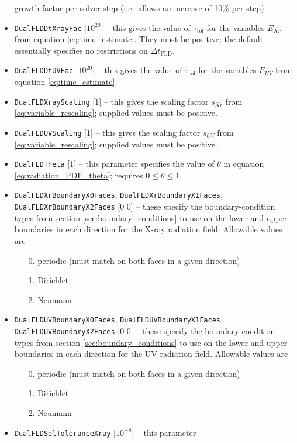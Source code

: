 \documentclass[letterpaper,10pt]{article}
\renewcommand{\(}{\left(}
\renewcommand{\)}{\right)}
\newcommand{\dt}{\Delta t}
\begin{document}
\begin{itemize}
  growth factor per solver step (i.e.~allows an increase of 10\% per step).
\item {\tt DualFLDDtXrayFac} [$10^{20}$] -- this gives the value
  of $\tau_{\text{tol}}$ for the variables $E_{Xr}$ from equation
  \eqref{eq:time_estimate}.  They must be positive; the default
  essentially specifies no restrictions on $\dt_{\text{FLD}}$. 
\item {\tt DualFLDDtUVFac} [$10^{20}$] -- this gives the value
  of $\tau_{\text{tol}}$ for the variables $E_{UV}$ from equation
  \eqref{eq:time_estimate}.
\item {\tt DualFLDXrayScaling} [1] -- this gives the scaling 
  factor $s_{Xr}$ from \eqref{eq:variable_rescaling}; supplied values
  must be positive. 
\item {\tt DualFLDUVScaling} [1] -- this gives the scaling 
  factor $s_{UV}$ from \eqref{eq:variable_rescaling}; supplied values
  must be positive. 
\item {\tt DualFLDTheta} [1] -- this parameter specifies the
  value of $\theta$ in equation \eqref{eq:radiation_PDE_theta};
  requires $0\le\theta\le 1$.
\item {\tt DualFLDXrBoundaryX0Faces}, {\tt DualFLDXrBoundaryX1Faces},
  {\tt DualFLDXrBoundaryX2Faces} [0 0] --  these specify the
  boundary-condition types from section \ref{sec:boundary_conditions}
  to use on the lower and upper boundaries in each direction for the
  X-ray radiation field.  Allowable values are
  \begin{itemize}
  \item[0.] periodic (must match on both faces in a given direction)
  \item[1.] Dirichlet
  \item[2.] Neumann
  \end{itemize}
\item {\tt DualFLDUVBoundaryX0Faces}, {\tt DualFLDUVBoundaryX1Faces},
  {\tt DualFLDUVBoundaryX2Faces} [0 0] --  these specify the
  boundary-condition types from section \ref{sec:boundary_conditions}
  to use on the lower and upper boundaries in each direction for the
  UV radiation field.  Allowable values are
  \begin{itemize}
  \item[0.] periodic (must match on both faces in a given direction)
  \item[1.] Dirichlet
  \item[2.] Neumann
  \end{itemize}
\item {\tt DualFLDSolToleranceXray} [$10^{-8}$] -- this parameter

\end{itemize}
\end{document}
